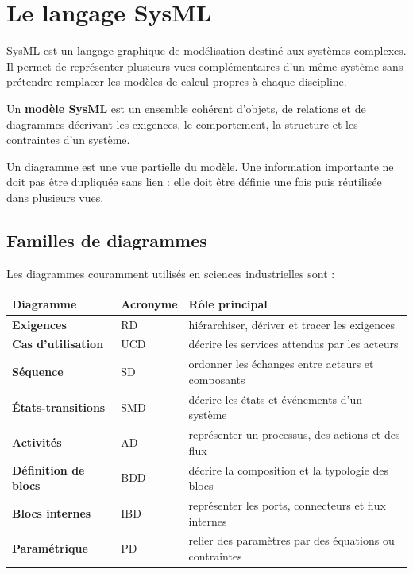 
\section{Le langage SysML}\label{sec:is-sysml}

SysML est un langage graphique de modélisation destiné aux systèmes complexes. Il permet de représenter plusieurs vues complémentaires d'un même système sans prétendre remplacer les modèles de calcul propres à chaque discipline.

\begin{ISdefinition}
Un \textbf{modèle SysML} est un ensemble cohérent d'objets, de relations et de diagrammes décrivant les exigences, le comportement, la structure et les contraintes d'un système.
\end{ISdefinition}

Un diagramme est une vue partielle du modèle. Une information importante ne doit pas être dupliquée sans lien : elle doit être définie une fois puis réutilisée dans plusieurs vues.

\subsection{Familles de diagrammes}

Les diagrammes couramment utilisés en sciences industrielles sont :

\begin{center}
\begin{tabularx}{\linewidth}{>{\bfseries}p{.25\linewidth}p{.13\linewidth}X}
\toprule
Diagramme & Acronyme & Rôle principal \\
\midrule
Exigences & RD & hiérarchiser, dériver et tracer les exigences \\
Cas d'utilisation & UCD & décrire les services attendus par les acteurs \\
Séquence & SD & ordonner les échanges entre acteurs et composants \\
États-transitions & SMD & décrire les états et événements d'un système \\
Activités & AD & représenter un processus, des actions et des flux \\
Définition de blocs & BDD & décrire la composition et la typologie des blocs \\
Blocs internes & IBD & représenter les ports, connecteurs et flux internes \\
Paramétrique & PD & relier des paramètres par des équations ou contraintes \\
\bottomrule
\end{tabularx}
\end{center}

